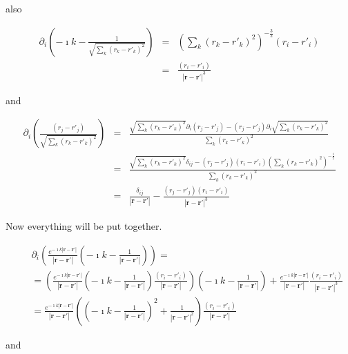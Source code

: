 \documentclass[a4paper,11pt]{thesis}
\begin{document}
also


\begin{eqnarray}
  \partial_{i}  \left( -\imath k- \frac{1}{\sqrt{\sum_k(r_k-r'_k)^2}}\right)&=& \left(\sum_k(r_k-r'_k)^2\right)^{-\frac{3}{2}}(r_i-r'_i)\nonumber\\
&=&\frac{(r_i-r'_i)}{| \mathbf{r}-\mathbf{r'}|^3}
 \end{eqnarray}


and


\begin{eqnarray}
  \partial_{i} \left( \frac{(r_j-r'_j)}{\sqrt{\sum_k(r_k-r'_k)^2}}\right)&=&\frac{\sqrt{\sum_k(r_k-r'_k)^2}\partial_{i}(r_j-r'_j)- (r_j-r'_j) \partial_{i}\sqrt{\sum_k(r_k-r'_k)^2}}{\sum_k(r_k-r'_k)^2}\nonumber\\
&=&\frac{\sqrt{\sum_k(r_k-r'_k)^2}\delta_{ij}- (r_j-r'_j)(r_i-r'_i) (\sum_k(r_k-r'_k)^2)^{-\frac{1}{2}}}{\sum_k(r_k-r'_k)^2}\nonumber\\
&=&\frac{\delta_{ij}}{| \mathbf{r}-\mathbf{r'}|}-\frac{ (r_j-r'_j)(r_i-r'_i) }{| \mathbf{r}-\mathbf{r'}|^3}
 \end{eqnarray}

Now everything will be put together.

\begin{eqnarray}
&& \partial_{i} \left( \frac{e^{- \imath k | \mathbf{r}-\mathbf{r'}|}}{| \mathbf{r}-\mathbf{r'}|} \left( -\imath k- \frac{1}{| \mathbf{r}-\mathbf{r'}|}\right)\right)=\nonumber\\
&&=\left( \frac{e^{- \imath k  | \mathbf{r}-\mathbf{r'}| }}{| \mathbf{r}-\mathbf{r'}|} \left( -\imath k- \frac{1}{| \mathbf{r}-\mathbf{r'}|}\right)\frac{(r_i-r'_i)}{| \mathbf{r}-\mathbf{r'}|}\right) \left( -\imath k- \frac{1}{| \mathbf{r}-\mathbf{r'}|}\right)+\frac{e^{- \imath k | \mathbf{r}-\mathbf{r'}|}}{| \mathbf{r}-\mathbf{r'}|}\frac{(r_i-r'_i)}{| \mathbf{r}-\mathbf{r'}|^3}\nonumber\\
&&=\frac{e^{- \imath k | \mathbf{r}-\mathbf{r'}|}}{| \mathbf{r}-\mathbf{r'}|}\left( \left( -\imath k- \frac{1}{| \mathbf{r}-\mathbf{r'}|}\right)^2 +  \frac{1}{| \mathbf{r}-\mathbf{r'}|^2}\right)\frac{(r_i-r'_i)}{| \mathbf{r}-\mathbf{r'}|}
 \end{eqnarray}

and
\end{document}
